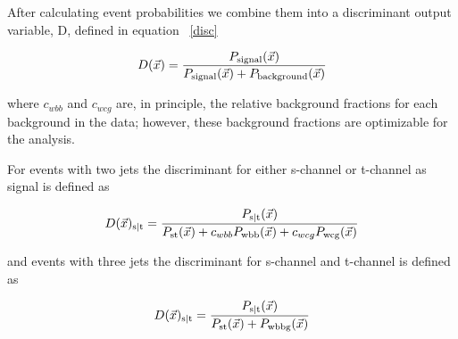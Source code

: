 After calculating event probabilities we combine them into a discriminant output variable, D, defined in equation ~\ref{disc}

\begin{equation}
\label{disc}
D(\vec{x}) = \frac{P_{\rm{signal}}(\vec{x})}{P_{\rm{signal}}(\vec{x}) + P_{\rm{background}}(\vec{x})}
\end{equation}

where $c_{wbb}$ and $c_{wcg}$ are, in principle, the relative background fractions for each background in the data; however, these background fractions are optimizable for the analysis. 

For events with two jets the discriminant for either s-channel or t-channel as signal is defined as

\begin{equation}
D(\vec{x})_{\rm{s|t}} = \frac{P_{\rm{s|t}}(\vec{x})}{P_{\rm{st}}(\vec{x}) + c_{wbb}P_{\rm{wbb}}(\vec{x}) + c_{wcg}P_{\rm{wcg}}(\vec{x})}
\end{equation}

and events with three jets the discriminant for s-channel and t-channel is defined as

\begin{equation}
D(\vec{x})_{\rm{s|t}} = \frac{P_{\rm{s|t}}(\vec{x})}{P_{\rm{st}}(\vec{x}) + P_{\rm{wbbg}}(\vec{x})}
\end{equation}





